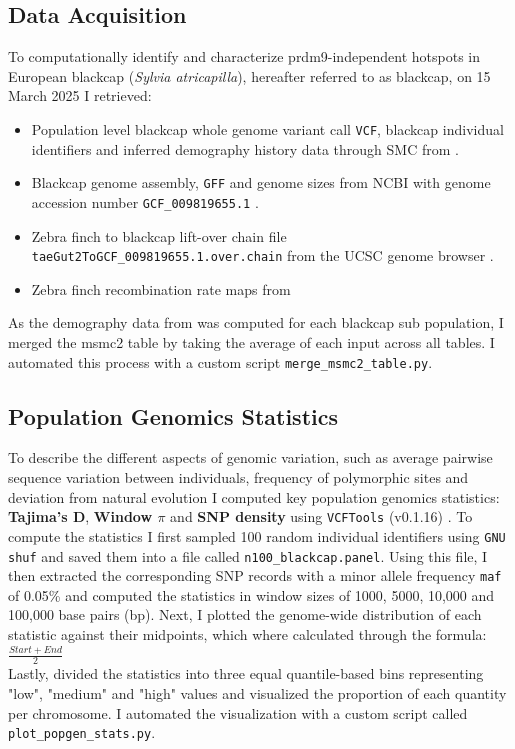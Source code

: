 \documentclass[12pt,a4paper]{article}
\begin{document}
\subsection{Data Acquisition}
To computationally identify and characterize prdm9-independent hotspots in
European blackcap (\textit{Sylvia atricapilla}), hereafter referred to as
blackcap, on 15 March 2025 I retrieved:
\begin{itemize}[label=--,itemsep=0pt]
	\item Population level blackcap whole genome variant call \texttt{VCF}, blackcap
	      individual identifiers and inferred demography history data through SMC from
	      \parencite{ishigohoka_high-recombining_2025}.
	\item Blackcap genome assembly, \texttt{GFF} and genome sizes from NCBI with genome
	      accession number \texttt{GCF\_009819655.1} \parencite{NCBI}.
	\item Zebra finch to blackcap lift-over chain file
	      \texttt{taeGut2ToGCF\_009819655.1.over.chain} from the UCSC genome browser
	      \parencite{UCSC, UCSC_2006_LiftOver}.
	\item Zebra finch recombination rate maps from \cite{singhal_2015}
\end{itemize}
As the demography data from \cite{ishigohoka_high-recombining_2025} was computed for each blackcap
sub population, I merged the msmc2 table by taking the average of each input across all tables.
I automated this process with a custom script \texttt{merge\_msmc2\_table.py}.

\subsection{Population Genomics Statistics}
To describe the different aspects of genomic variation, such as average pairwise sequence
variation between individuals, frequency of polymorphic sites and deviation from natural evolution I
computed key population genomics statistics: \textbf{Tajima's D},
\textbf{Window $\pi$} and \textbf{SNP density} using \texttt{VCFTools}
(v0.1.16) \parencite{vcftools, Tajima-1989, nei-and-li-1979}. To compute the statistics I first sampled 100
random individual identifiers using \texttt{GNU shuf} and saved them into a
file called \texttt{n100\_blackcap.panel}. Using this file, I then extracted
the corresponding SNP records with a minor allele frequency \texttt{maf} of
0.05\% and computed the statistics in window sizes of 1000, 5000, 10,000 and
100,000 base pairs (bp). Next, I plotted the genome-wide distribution of each
statistic against their midpoints, which where calculated through the formula:
$\frac{Start + End}{2}$ \\ Lastly, divided the statistics into three equal
quantile-based bins representing "low", "medium" and "high" values and
visualized the proportion of each quantity per chromosome. I automated the
visualization with a custom script called \texttt{plot\_popgen\_stats.py}.
\end{document}
